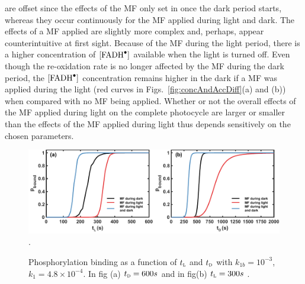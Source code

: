 \documentclass[twoside,twocolumn,9pt]{article}
\begin{document}
are offset since the effects of the MF only set in once the dark period starts, whereas they occur continuously for the MF applied 
during light and dark. The effects of a MF applied are slightly more complex and, perhaps, appear counterintuitive at first sight. 
Because of the MF during the light period, there is a higher concentration of $[\ce{FADH^{.}}]$ available when the light is turned 
off. Even though the re-oxidation rate is no longer affected by the MF during the dark period, the $[\ce{FADH^{.}}]$ concentration 
remains higher in the dark if a MF was applied during the light (red curves in Figs.~\ref{fig:concAndAccDiff}(a) and (b)) when 
compared with no MF being applied. Whether or not the overall effects of the MF applied during light on the complete photocycle are 
larger or smaller than the effects of the MF applied during light thus depends sensitively on the chosen parameters.

\begin{figure}[h]
	\centering
	\includegraphics{varyT1T2.pdf}.
	\caption{Phosphorylation binding as a function of $t_{\textsc{l}}$ and $t_{\textsc{d}}$ with $k_{1b} = 10^{-3}$, $k_{1} = 4.8 \times 10^{-4}$. In fig (a) $t_{\textsc{d}} = 600s$ and in fig(b) $t_{\textsc{l}} = 300s$ .}
	\label{fig:varyT1T2}
\end{figure}
\end{document}
